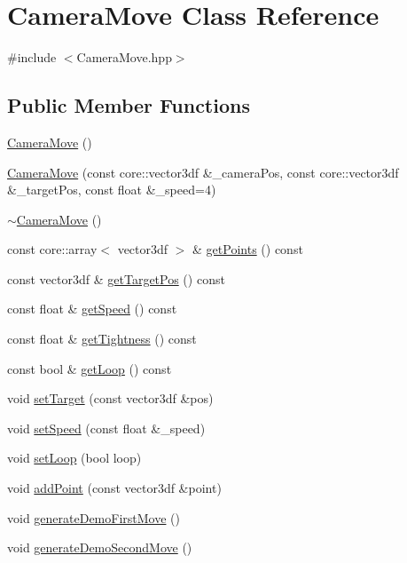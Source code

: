 \hypertarget{class_camera_move}{}\section{Camera\+Move Class Reference}
\label{class_camera_move}


{\ttfamily \#include $<$Camera\+Move.\+hpp$>$}

\subsection*{Public Member Functions}
\begin{DoxyCompactItemize}
\item 
\mbox{\hyperlink{class_camera_move_a43a97ea2a268ce918de3f9e81b949016}{Camera\+Move}} ()
\item 
\mbox{\hyperlink{class_camera_move_a2397a927288ccadb4ee045727e6c8422}{Camera\+Move}} (const core\+::vector3df \&\+\_\+camera\+Pos, const core\+::vector3df \&\+\_\+target\+Pos, const float \&\+\_\+speed=4)
\item 
\mbox{\hyperlink{class_camera_move_a0cb144035fef2df240dc99005bc6f2fb}{$\sim$\+Camera\+Move}} ()
\item 
const core\+::array$<$ vector3df $>$ \& \mbox{\hyperlink{class_camera_move_aead3c97a2191291f3dcd767480d4106e}{get\+Points}} () const
\item 
const vector3df \& \mbox{\hyperlink{class_camera_move_aee3587ddae21b6b488aff441fe6b35ee}{get\+Target\+Pos}} () const
\item 
const float \& \mbox{\hyperlink{class_camera_move_a5ede7abe6d5f9def855d41b2d455b8d5}{get\+Speed}} () const
\item 
const float \& \mbox{\hyperlink{class_camera_move_abefb0317a48e3461955fe6cf32645fa6}{get\+Tightness}} () const
\item 
const bool \& \mbox{\hyperlink{class_camera_move_a6e00aa01788a602f8739bdd475f5c7e6}{get\+Loop}} () const
\item 
void \mbox{\hyperlink{class_camera_move_a94a1b0d11858511420b7a5d9d084f8c8}{set\+Target}} (const vector3df \&pos)
\item 
void \mbox{\hyperlink{class_camera_move_aa201a349bebb67370850864af47528cc}{set\+Speed}} (const float \&\+\_\+speed)
\item 
void \mbox{\hyperlink{class_camera_move_a69610708690e020a0774ef5ade52e288}{set\+Loop}} (bool loop)
\item 
void \mbox{\hyperlink{class_camera_move_acf17e6c4e083e7d2565ec8aae99b39bc}{add\+Point}} (const vector3df \&point)
\item 
void \mbox{\hyperlink{class_camera_move_a56c064e8e26e70facba67cf82d45ef77}{generate\+Demo\+First\+Move}} ()
\item 
void \mbox{\hyperlink{class_camera_move_a1a14a405dca4d297b2cf15c4aedc9321}{generate\+Demo\+Second\+Move}} ()
\end{DoxyCompactItemize}


